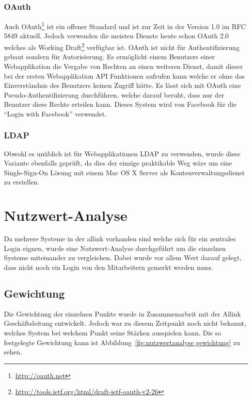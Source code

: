 \subsubsection{OAuth}
\label{ssub:OAuth}
Auch OAuth\footnote{\url{http://oauth.net}} ist ein offener Standard und ist zur
Zeit in der Version 1.0 im RFC
5849\cite{rfc5849} aktuell. Jedoch
verwenden die meisten Dienste heute schon OAuth 2.0 welches als Working
Draft\footnote{\url{http://tools.ietf.org/html/draft-ietf-oauth-v2-26}}
verfügbar ist. OAuth ist nicht für Authentifizierung gebaut sondern für
Autorisierung. Es ermöglicht einem Benutzers einer Webapplikation die Vergabe
von Rechten an einen weiteren Dienst, damit dieser bei der ersten Webapplikation
API Funktionen aufrufen kann welche er ohne das Einverständnis des Benutzers
keinen Zugriff hätte. Es lässt sich mit OAuth eine Pseudo-Authentifizierung
durchführen, welche darauf beruht, dass nur der Benutzer diese Rechte erteilen
kann. Dieses System wird von Facebook für die ``Login with Facebook'' verwendet.

\subsubsection{LDAP}
\label{ssub:LDAP}
Obwohl es unüblich ist für Webapplikationen LDAP\cite{rfc4511} zu verwenden, wurde diese
Variante ebenfalls geprüft, da dies der einzige praktikable Weg wäre um eine
Single-Sign-On Lösung mit einem Mac OS X Server als Kontenverwaltungsdienst zu
erstellen.

\section{Nutzwert-Analyse}
\label{sec:Nutzwert-Analyse}
Da mehrere Systeme in der allink vorhanden sind welche sich für ein zentrales
Login eignen, wurde eine Nutzwert-Analyse durchgeführt um die einzelnen Systeme
miteinander zu vergleichen. Dabei wurde vor allem Wert darauf gelegt, dass nicht
noch ein Login von den Mitarbeitern gemerkt werden muss.

\subsection{Gewichtung}
\label{sub:Gewichtung}
Die Gewichtung der einzelnen Punkte wurde in Zusammenarbeit mit der Allink
Geschäftsleitung entwickelt. Jedoch war zu diesem Zeitpunkt noch nicht bekannt,
welches System bei welchem Punkt seine Stärken ausspielen kann. Die so
festgelegte Gewichtung kann ist Abbildung~\ref{fig:nutzwertanalyse gewichtung} zu sehen.

